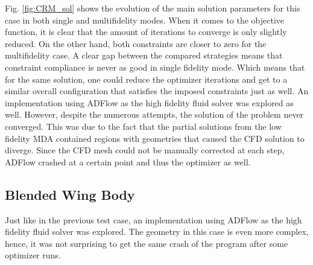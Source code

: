 \documentclass[conf]{new-aiaa}
\begin{document}
Fig. \ref{fig:CRM_sol} shows the evolution of the main solution parameters for this case in both single and multifidelity modes. When it comes to the objective function, it is clear that the amount of iterations to converge is only slightly reduced. On the other hand, both constraints are closer to zero for the multifidelity case. A clear gap between the compared strategies means that constraint compliance is never as good in single fidelity mode. Which means that for the same solution, one could reduce the optimizer iterations and get to a similar overall configuration that satisfies the imposed constraints just as well. 
An implementation using ADFlow as the high fidelity fluid solver was explored as well. However, despite the numerous attempts, the solution of the problem never converged. This was due to the fact that the partial solutions from the low fidelity MDA contained regions with geometries that caused the CFD solution to diverge. Since the CFD mesh could not be manually corrected at each step, ADFlow crashed at a certain point and thus the optimizer as well.

\subsection{Blended Wing Body}

Just like in the previous test case, an implementation using ADFlow as the high fidelity fluid solver was explored. The geometry in this case is even more complex, hence, it was not surprising to get the same crash of the program after some optimizer runs. 
\end{document}
